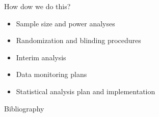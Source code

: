 \documentclass[13pt]{beamer}
\begin{document}
\begin{frame}{How dow we do this?}
\begin{itemize}
\items Graphs
\items Charts
\item Sample size and power analyses
\item Randomization and blinding procedures
\item Interim analysis
\item Data monitoring plans
\item Statistical analysis plan and implementation
\end{itemize} 
\end{frame}

\begin{frame}[allowframebreaks]{Bibliography}


\end{frame}
\end{document}
